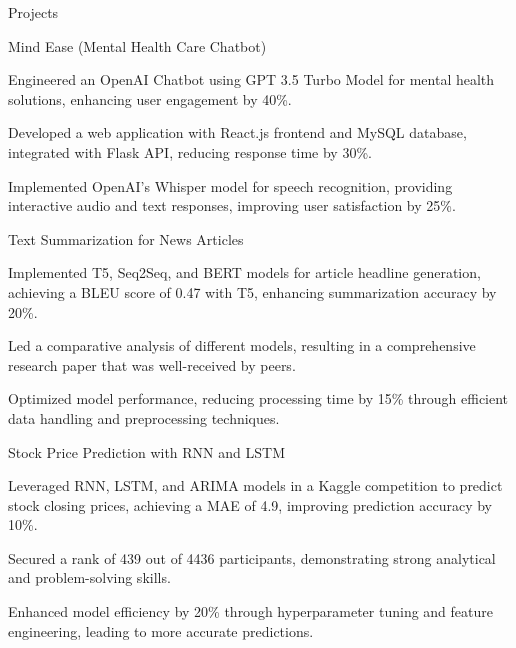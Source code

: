 \documentclass{resume} %
\begin{document}
    \begin{rSection}{Projects}
                    \begin{rSubsection}
                                    {Mind Ease (Mental Health Care Chatbot)}
                                {}{}{}
                                    \item Engineered an OpenAI Chatbot using GPT 3.5 Turbo Model for mental health solutions, enhancing user engagement by 40\%.
                                    \item Developed a web application with React.js frontend and MySQL database, integrated with Flask API, reducing response time by 30\%.
                                    \item Implemented OpenAI's Whisper model for speech recognition, providing interactive audio and text responses, improving user satisfaction by 25\%.
                            \end{rSubsection}
                    \begin{rSubsection}
                                    {Text Summarization for News Articles}
                                {}{}{}
                                    \item Implemented T5, Seq2Seq, and BERT models for article headline generation, achieving a BLEU score of 0.47 with T5, enhancing summarization accuracy by 20\%.
                                    \item Led a comparative analysis of different models, resulting in a comprehensive research paper that was well{-}received by peers.
                                    \item Optimized model performance, reducing processing time by 15\% through efficient data handling and preprocessing techniques.
                            \end{rSubsection}
                    \begin{rSubsection}
                                    {Stock Price Prediction with RNN and LSTM}
                                {}{}{}
                                    \item Leveraged RNN, LSTM, and ARIMA models in a Kaggle competition to predict stock closing prices, achieving a MAE of 4.9, improving prediction accuracy by 10\%.
                                    \item Secured a rank of 439 out of 4436 participants, demonstrating strong analytical and problem{-}solving skills.
                                    \item Enhanced model efficiency by 20\% through hyperparameter tuning and feature engineering, leading to more accurate predictions.
                            \end{rSubsection}
            \end{rSection}
\end{document}
